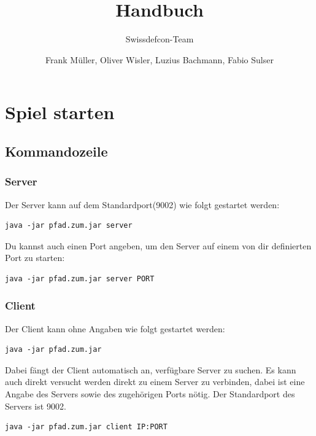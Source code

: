 \documentclass[ngerman, 12pt, pdftex]{scrartcl}[2006/07/30]
\title{Handbuch}
\author{Frank M\"{u}ller, Oliver Wisler, Luzius Bachmann, Fabio Sulser}
\subtitle{Swissdefcon-Team}
\begin{document}
\pagestyle{fancy}
\fancyhf{} 
\fancyhead[R]{\thepage}  %
\renewcommand{\headrulewidth}{0.1pt} 	%



\maketitle


\newpage

\tableofcontents

\newpage

\section{Spiel starten}
\subsection{Kommandozeile}
\subsubsection{Server}
Der Server kann auf dem Standardport(9002) wie folgt gestartet werden:

\begin{lstlisting}
java -jar pfad.zum.jar server
\end{lstlisting}
Du kannst auch einen Port angeben, um den Server auf einem von dir definierten Port zu starten:
\begin{lstlisting}
java -jar pfad.zum.jar server PORT
\end{lstlisting}
           

\subsubsection{Client}
Der Client kann ohne Angaben wie folgt gestartet werden:
\begin{lstlisting}
java -jar pfad.zum.jar
\end{lstlisting}
Dabei fängt der Client automatisch an, verfügbare Server zu suchen. 
Es kann auch direkt versucht werden direkt zu einem Server zu verbinden, 
dabei ist eine Angabe des Servers sowie des zugehörigen Ports nötig.
Der Standardport des Servers ist 9002.
\begin{lstlisting}
java -jar pfad.zum.jar client IP:PORT 
\end{lstlisting}
\end{document}
